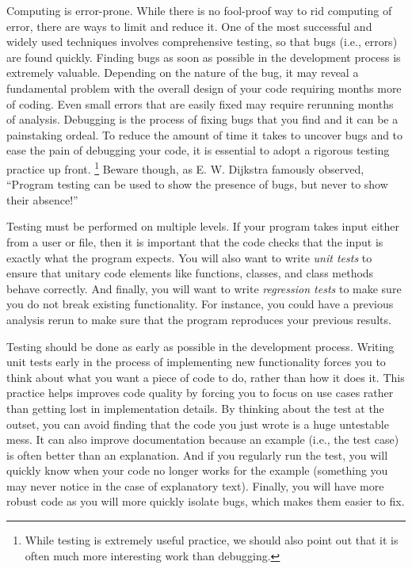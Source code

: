 \documentclass[ChapterTOCs,krantz2]{krantz} %
\theoremstyle{definition}
\begin{document}
Computing is error-prone. While there is no
fool-proof way to rid computing of error, there are ways to limit and reduce
it. One of the most successful and widely used techniques involves
comprehensive testing, so that bugs (i.e., errors) are found quickly. Finding
bugs as soon as possible in the development process is extremely valuable.
Depending on the nature of the bug, it may reveal a fundamental problem with
the overall design of your code requiring months more of coding.  Even small
errors that are easily fixed may require rerunning months of analysis.
Debugging is the process of fixing bugs that you find and it can be a
painstaking ordeal. To reduce the amount of time it takes to uncover bugs and
to ease the pain of debugging your code, it is essential to adopt a rigorous
testing practice up front.%
\footnote{While testing is extremely useful
practice, we should also point out that it is often much more interesting work
than debugging.} Beware though, as E. W. Dijkstra famously observed, ``Program
testing can be used to show the presence of bugs, but never to show their
absence!'' \cite{dahl1972structured}

Testing must be performed on multiple levels. If your program takes input
either from a user or file, then it is important that the code checks that the
input is exactly what the program expects. You will also want to write
\emph{unit tests} to ensure that unitary code elements like functions, classes,
and class methods behave correctly. And finally, you will want to write
\emph{regression tests} to make sure you do not break existing functionality.
For instance, you could have a previous analysis rerun to make sure that the
program reproduces your previous results.

Testing should be done as early as possible in the development process.
Writing unit tests early in the process of implementing new functionality
forces you to think about what you want a piece of code to do, rather than how
it does it. This practice helps improves code quality by forcing you to focus
on use cases rather than getting lost in implementation details. By thinking
about the test at the outset, you can avoid finding that the code you just
wrote is a huge untestable mess. It can also improve documentation because an
example (i.e., the test case) is often better than an explanation. And if you
regularly run the test, you will quickly know when your code no longer works
for the example (something you may never notice in the case of explanatory
text). Finally, you will have more robust code as you will more quickly
isolate bugs, which makes them easier to fix.\cite{oram2010making}
\end{document}

